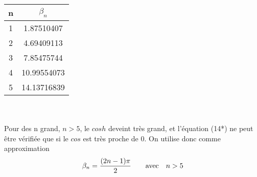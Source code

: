\documentclass[a4paper,10pt]{article}
\begin{document}
\begin{tabular}{|c|c|}
\hline
n & \begin{math} \beta_n \end{math} \\ \hline
1 & 1.87510407 \\ \hline
2 & 4.69409113 \\ \hline
3 & 7.85475744	\\ \hline
4 & 10.99554073	\\ \hline
5 & 14.13716839	\\ \hline
\end{tabular}
\\\\
Pour des n grand, \begin{math} n>5 \end{math}, le \begin{math} cosh \end{math} deveint très grand, et l'équation (14*) ne peut être vérifiée que si le \begin{math} cos \end{math} est très proche de 0. On utilise donc comme approximation \begin{equation} \beta_n = \frac{(2n-1)\pi}{2} \text{\qquad avec\quad} n>5\end{equation}
\end{document}
